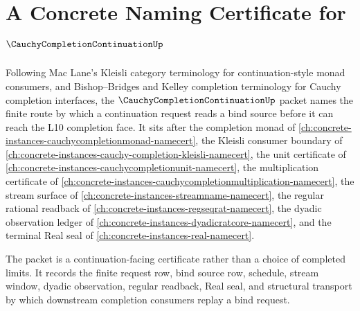 \chapter{A Concrete Naming Certificate for $\CauchyCompletionContinuationUp$}
\label{ch:concrete-instances-cauchy-completion-continuation-namecert}

Following Mac Lane's Kleisli category terminology for continuation-style monad consumers, and Bishop--Bridges and Kelley completion terminology for Cauchy completion interfaces, the $\CauchyCompletionContinuationUp$ packet names the finite route by which a continuation request reads a bind source before it can reach the L10 completion face. It sits after the completion monad of \autoref{ch:concrete-instances-cauchycompletionmonad-namecert}, the Kleisli consumer boundary of \autoref{ch:concrete-instances-cauchy-completion-kleisli-namecert}, the unit certificate of \autoref{ch:concrete-instances-cauchycompletionunit-namecert}, the multiplication certificate of \autoref{ch:concrete-instances-cauchycompletionmultiplication-namecert}, the stream surface of \autoref{ch:concrete-instances-streamname-namecert}, the regular rational readback of \autoref{ch:concrete-instances-regseqrat-namecert}, the dyadic observation ledger of \autoref{ch:concrete-instances-dyadicratcore-namecert}, and the terminal Real seal of \autoref{ch:concrete-instances-real-namecert}.

The packet is a continuation-facing certificate rather than a choice of completed limits. It records the finite request row, bind source row, schedule, stream window, dyadic observation, regular readback, Real seal, and structural transport by which downstream completion consumers replay a bind request.

